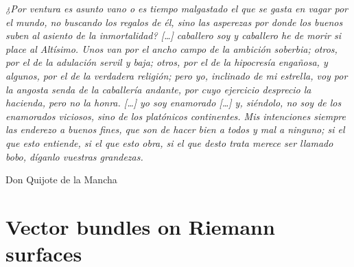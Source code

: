 \documentclass[12pt,a4paper]{book}
\theoremstyle{definition} \newtheorem{defn}[thm]{Definition}
\theoremstyle{definition} \newtheorem{ejemplo}[thm]{Example}
\theoremstyle{remark} \newtheorem{rem}[thm]{Remark}
\begin{document}
\newpage\null\thispagestyle{empty}
\newpage\null\thispagestyle{empty}
\epigraph{\textit{¿Por ventura es asunto vano o es tiempo malgastado el que se gasta en vagar por el mundo, no buscando los regalos de él, sino las
asperezas por donde los buenos suben al asiento de la inmortalidad? [\dots] caballero soy y caballero he de morir si place al Altísimo. Unos van por el
ancho campo de la ambición soberbia; otros, por el de la adulación servil y baja; otros, por el de la hipocresía engañosa, y algunos, por el de la 
verdadera religión; pero yo, inclinado de mi estrella, voy por la angosta senda de la caballería andante, por cuyo ejercicio desprecio la hacienda, pero
no la honra. [\dots] yo soy enamorado [\dots] y, siéndolo, no soy de los enamorados viciosos, sino de los platónicos continentes. Mis intenciones siempre
las enderezo a buenos fines, que son de hacer bien a todos y mal a ninguno; si el que esto entiende, si el que esto obra, si el que desto trata merece
ser llamado bobo, díganlo vuestras grandezas.}}{Don Quijote de la Mancha}
\tableofcontents
\chapter{Vector bundles on Riemann surfaces}
\end{document}
